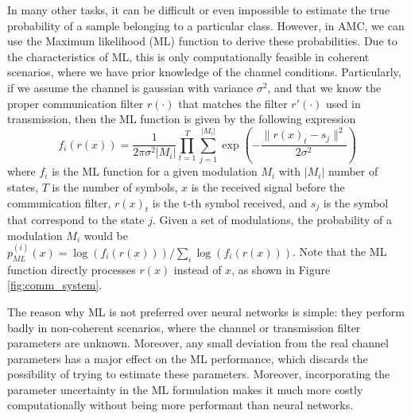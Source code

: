 \documentclass[conference]{IEEEtran}
\begin{document}
In many other tasks, it can be difficult or even impossible to estimate the true probability of a sample belonging to a particular class. However, in AMC, we can use the Maximum likelihood (ML) function to derive these probabilities. Due to the characteristics of ML, this is only computationally feasible in coherent scenarios, where we have prior knowledge of the channel conditions. Particularly, if we assume the channel is gaussian with variance $\sigma^{2}$, and that we know the proper communication filter $r(\cdot)$ that matches the filter $r'(\cdot)$ used in transmission, then the ML function is given by the following expression
\begin{equation}
	f_{i}(r(x)) = \dfrac{1}{2\pi \sigma^{2}|M_i|}\prod_{t=1}^{T} \sum_{j=1}^{|M_i|} \exp\left(-\dfrac{\lVert r(x)_t - s_j\rVert^{2}}{2 \sigma^{2}}\right)
\label{eq:ml}
\end{equation}
where $f_{i}$ is the ML function for a given modulation $M_i$ with $|M_i|$ number of states, $T$ is the number of symbols, $x$ is the received signal before the communication filter, $r(x)_t$ is the t-th symbol received, and $s_j$ is the symbol that correspond to the state $j$. Given a set of modulations, the probability of a modulation $M_i$ would be $p_{ML}^{(i)}(x) = \log(f_{i}(r(x))) / \sum_i \log(f_{i}(r(x)))$. Note that the ML function directly processes $r(x)$ instead of $x$, as shown in Figure \ref{fig:comm_system}.

The reason why ML is not preferred over neural networks is simple: they perform badly in non-coherent scenarios, where the channel or transmission filter parameters are unknown. Moreover, any small deviation from the real channel parameters has a major effect on the ML performance, which discards the possibility of trying to estimate these parameters. Moreover, incorporating the parameter uncertainty in the ML formulation makes it much more costly computationally without being more performant than neural networks.
\end{document}
